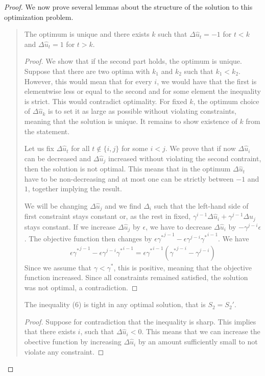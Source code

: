 \begin{proof}
We now prove several lemmas about the structure of the solution to this optimization problem.
\begin{quotation}
\begin{lemma} \label{lem:structure}
The optimum is unique and there exists $k$ such that $\Delta \hat{u}_t = -1$ for $t < k$ and $\Delta \hat{u}_t = 1$ for $t > k$.
\end{lemma}
\begin{proof}
We show that if the second part holds, the optimum is unique. Suppose that there are two optima with $k_1$ and $k_2$ such that $k_1 < k_2$. However, this would mean that for every $i$, we would have that the first is elementwise less or equal to the second and for some element the inequality is strict. This would contradict optimality. For fixed $k$, the optimum choice of $\Delta \hat{u}_k$ is to set it as large as possible without violating constraints, meaning that the solution is unique. It remains to show existence of $k$ from the statement.

Let us fix $\Delta \hat{u}_t$ for all $t \not \in \{i,j\}$ for some $i < j$. We prove that if now $\Delta \hat{u}_i$ can be decreased and $\Delta \hat{u}_j$ increased without violating the second contraint, then the solution is not optimal. This means that in the optimum $\Delta \hat{u}_t$ have to be non-decreasing and at most one can be strictly between $-1$ and $1$, together implying the result.

We will be changing $\Delta \hat{u}_j$ and we find $\Delta_i$ such that the left-hand side of first constraint stays constant or, as the rest in fixed, $\gamma^{i-1} \Delta \hat{u}_i + \gamma^{j-1} \Delta \hat{u}_j$ stays constant. If we increase $\Delta \hat{u}_j$ by $\epsilon$, we have to decrease $\Delta \hat{u}_i$ by $-\gamma^{j-i} \epsilon$. The objective function then changes by $\epsilon {\gamma^*}^{j-1} - \epsilon \gamma^{j-i} {\gamma^*}^{i-1}$. We have
\begin{gather}
\epsilon {\gamma^*}^{j-1} - \epsilon \gamma^{j-i} {\gamma^*}^{i-1} = \epsilon {\gamma^*}^{i-1} ( {\gamma^*}^{j-i} - \gamma^{j-i} )
\end{gather}
Since we assume that $\gamma < \gamma^*$, this is positive, meaning that the objective function increased. Since all constraints remained satisfied, the solution was not optimal, a contradiction.
\end{proof}

\begin{lemma} \label{lem:tight_inequality}
The inequality (6) is tight in any optimal solution, that is $S_2 = S_2'$.
\end{lemma}
\begin{proof}
Suppose for contradiction that the inequality is sharp. This implies that there exists $i$, such that $\Delta \hat{u}_i < 0$. This means that we can increase the obective function by increasing $\Delta \hat{u}_i$ by an amount sufficiently small to not violate any constraint.
\end{proof}
\end{quotation}


\end{proof}
